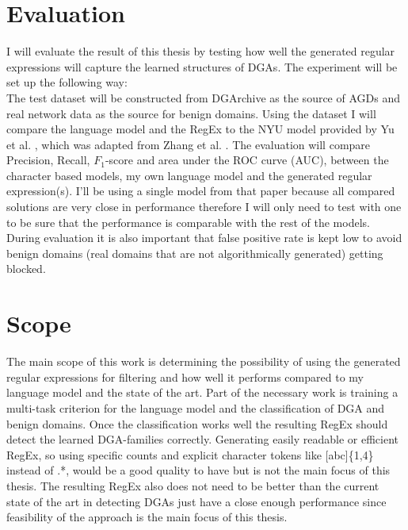 \documentclass[a4paper, 12pt]{article}
\begin{document}
\section{Evaluation}
I will evaluate the result of this thesis by testing how well the generated regular expressions
will capture the learned structures of DGAs.  
The experiment will be set up the following way:\\
The test dataset will be constructed from DGArchive\cite{DGArchiveFraunhoferFKIE} as the source of AGDs and
real network data as the source for benign domains.
Using the dataset I will compare the language model and the RegEx to the NYU model provided by Yu et
al. 
\cite{yuCharacterLevelBased2018}, which was adapted from Zhang et al. \cite{NIPS2015_250cf8b5}. The evaluation will compare Precision, Recall,
$F_1$-score and area under the ROC curve (AUC), between the character based models, my own language
model and the generated regular expression(s). I'll be using a single model from that paper because
all compared solutions are very close in performance therefore I will only need to test with one to
be sure that the performance is comparable with the rest of the models.
During evaluation it is also important that false positive rate is kept low to avoid benign domains
(real domains that are not algorithmically generated) getting blocked.
\section{Scope}
The main scope of this work is determining the possibility of using the generated regular
expressions for filtering and how well it performs compared to my language model and the state of the art.
Part of the necessary work is training a multi-task criterion for the language model and the
classification of DGA and benign domains. 
Once the classification works well the resulting RegEx should detect the learned DGA-families
correctly. Generating easily readable or efficient RegEx, so using specific counts and explicit
character tokens like [abc]\{1,4\} instead of .*, would be a good quality to have but is not
the main focus of this thesis. 
The resulting RegEx also does not need to be better than the current state of the art in detecting
DGAs just have a close enough performance since feasibility of the approach is the main focus of
this thesis.
\end{document}
